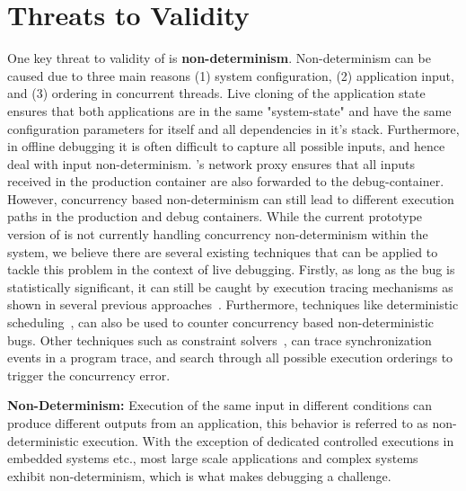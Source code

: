 \vspace{-2mm}
\section{Threats to Validity}
\label{sec:threats}

\noindent
One key threat to validity of \parikshan is \textbf{non-determinism}. 
Non-determinism can be caused due to three main reasons (1) system configuration, (2) application input, and (3) ordering in concurrent threads.
Live cloning of the application state ensures that both applications are in the same "system-state" and have the same configuration parameters for itself and all dependencies in it's stack.
Furthermore, in offline debugging it is often difficult to capture all possible inputs, and hence deal with input non-determinism.
\parikshan's network proxy ensures that all inputs received in the production container are also forwarded to the debug-container.
However, concurrency based non-determinism can still lead to different execution paths in the production and debug containers.
While the current prototype version of \parikshan is not currently handling concurrency non-determinism within the system, we believe there are several existing techniques that can be applied to tackle this problem in the context of live debugging. 
Firstly, as long as the bug is statistically significant, it can still be caught by execution tracing mechanisms as shown in several previous approaches~\cite{Liblit:2004:CBI}.
Furthermore, techniques like deterministic scheduling~\cite{smt:cacm}, can also be used to counter concurrency based non-deterministic bugs.
Other techniques such as constraint solvers~\cite{dpor, best}, can trace synchronization events in a program trace, and search through all possible execution orderings to trigger the concurrency error.


\iffalse

\textbf{Non-Determinism: } 
Execution of the same input in different conditions can produce different outputs from an application, this behavior is referred to as non-deterministic execution.
With the exception of dedicated controlled executions in embedded systems etc., most large scale applications and complex systems exhibit non-determinism, which is what makes debugging a challenge.

